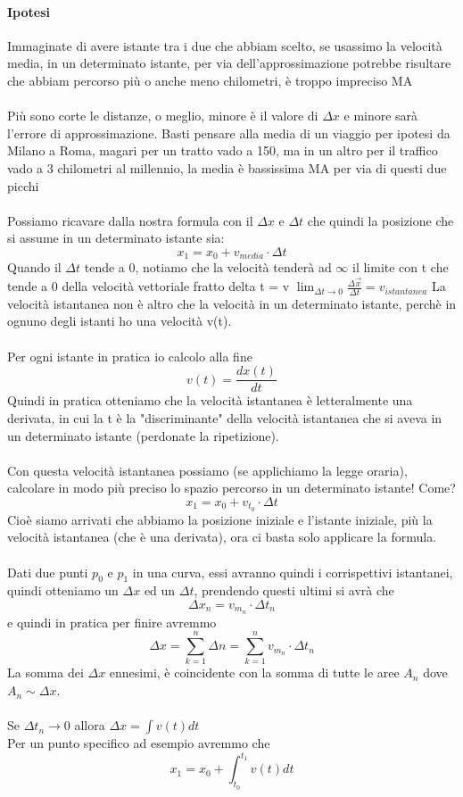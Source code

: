 \documentclass[12pt, a4paper, openany, oneside]{book}
\begin{document}
\paragraph{Ipotesi} Immaginate di avere istante tra i due che abbiam scelto,
se usassimo la velocità media, in un determinato istante, per via dell'approssimazione
potrebbe risultare che abbiam percorso più o anche meno chilometri, è troppo
impreciso MA
\\ \\
Più sono corte le distanze, o meglio, minore è il valore di $\Delta x$ e minore
sarà l'errore di approssimazione. Basti pensare alla media di un viaggio per
ipotesi da Milano a Roma, magari per un tratto vado a 150, ma in un altro per 
il traffico vado a 3 chilometri al millennio, la media è bassissima MA per via
di questi due picchi
\\ \\
Possiamo ricavare dalla nostra formula con il $\Delta x$ e $\Delta t$ che quindi
la posizione che si assume in un determinato istante sia:
$$x_{1} = x_{0} + v_{media} \cdot \Delta t$$
Quando il $\Delta t$ tende a 0, notiamo che la velocità tenderà ad $\infty$
il limite con t che tende a 0 della velocità vettoriale fratto delta t = v
$\lim_{\Delta t \to 0} \frac{\Delta \vec{x}}{\Delta t} = v_{istantanea}$
La velocità istantanea non è altro che la velocità in un determinato istante,
perchè in ognuno degli istanti ho una velocità v(t). \\ \\
Per ogni istante in pratica io calcolo alla fine 
$$v(t) = \frac{dx(t)}{dt}$$
Quindi in pratica otteniamo che la velocità istantanea è letteralmente una 
derivata, in cui la t è la "discriminante" della velocità istantanea che si 
aveva in un determinato istante (perdonate la ripetizione).
\\ \\ 
Con questa velocità istantanea possiamo (se applichiamo la legge oraria), 
calcolare in modo più preciso lo spazio percorso in un determinato istante! Come?
$$x_{1} = x_{0} + v_{t_{0}} \cdot \Delta t$$
Cioè siamo arrivati che abbiamo la posizione iniziale e l'istante iniziale, più
la velocità istantanea (che è una derivata), ora ci basta solo applicare la 
formula. 
\\ \\ 
Dati due punti $p_{0}$ e $p_{1}$ in una curva, essi avranno quindi i corrispettivi 
istantanei, quindi otteniamo un $\Delta x$ ed un $\Delta t$, prendendo questi 
ultimi si avrà che $$\Delta x_{n} = v_{m_{n}} \cdot \Delta t_{n}$$ e quindi in 
pratica per finire avremmo
$$\Delta x = \sum_{k=1}^n \Delta n = \sum_{k=1}^n v_{m_{n}} \cdot \Delta t_{n}$$
La somma dei $\Delta x$ ennesimi, è coincidente con la somma di tutte le aree
$A_{n}$ dove $A_{n} \sim \Delta x$. \\ \\
Se $\Delta t_{n} \to 0$ allora $\Delta x = \int v(t) dt$ \\
Per un punto specifico ad esempio avremmo che 
$$x_{1} = x_{0} + \int_{t_{0}}^{t_{1}} v(t) dt $$
\end{document}
